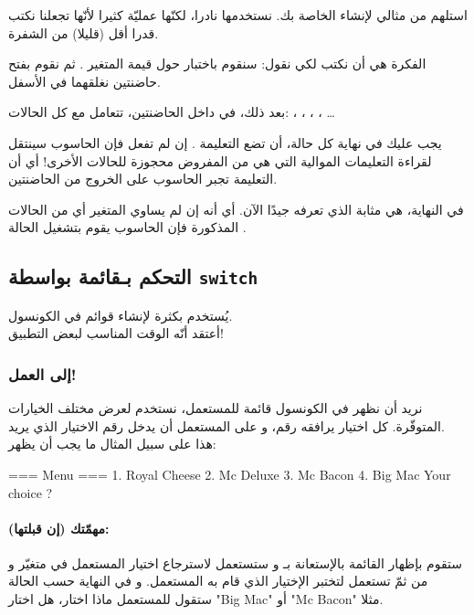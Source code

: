 استلهم من مثالي لإنشاء
الخاصة بك. نستخدمها نادرا، لكنّها عمليّة كثيرا لأنّها تجعلنا نكتب قدرا أقل (قليلا) من الشفرة.

الفكرة هي أن نكتب 
 لكي نقول: سنقوم باختبار حول قيمة المتغير
.
ثم نقوم بفتح حاضنتين نغلقهما في الأسفل.

بعد ذلك، في داخل الحاضنتين، تتعامل مع كل الحالات:
، ، ، ، \dots

يجب عليك في نهاية كل حالة، أن تضع التعليمة 
.
إن لم تفعل فإن الحاسوب سينتقل لقراءة التعليمات الموالية التي هي  من المفروض محجوزة للحالات الأخرى! أي أن التعليمة 
تجبر الحاسوب على الخروج من الحاضنتين.

في النهاية،
هي مثابة 
الذي تعرفه جيدًا الآن. أي أنه إن لم يساوي المتغير أي من الحالات المذكورة فإن الحاسوب يقوم بتشغيل الحالة
.

\subsection{التحكم بـقائمة بواسطة \texttt{switch}}

يُستخدم بكثرة لإنشاء قوائم في الكونسول.\\
أعتقد أنّه الوقت المناسب لبعض التطبيق!

\subsubsection{إلى العمل!}

نريد أن نظهر في الكونسول قائمة للمستعمل، نستخدم
لعرض مختلف الخيارات المتوفّرة. كل اختيار يرافقه رقم، و على المستعمل أن يدخل رقم الاختيار الذي يريد.\\
هذا على سبيل المثال ما يجب أن يظهر:

\begin{Console}
=== Menu ===
1. Royal Cheese
2. Mc Deluxe
3. Mc Bacon
4. Big Mac
Your choice ?
\end{Console}

\paragraph{مهمّتك (إن قبلتها):}
ستقوم بإظهار القائمة بالإستعانة بـ 
و ستستعمل 
لاسترجاع اختيار المستعمل  في متغيّر
و من ثمّ تستعمل
لتختبر الإختيار الذي قام به المستعمل. و في النهاية حسب الحالة ستقول للمستعمل ماذا اختار، هل اختار
"\textenglish{Big Mac}"
أو
"\textenglish{Mc Bacon}"
مثلا.

